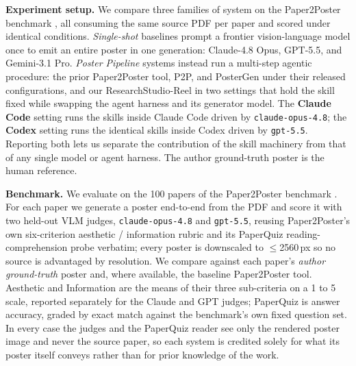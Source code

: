 \documentclass{article}
\newcommand{\reelword}{\textcolor{msred}{R}\textcolor{msgreen}{e}\textcolor{msblue}{e}\textcolor{msyellow}{l}}
\begin{document}
\textbf{Experiment setup.} We compare three families of system on the Paper2Poster benchmark \citep{paper2poster}, all consuming the same source PDF per paper and scored under identical conditions. \emph{Single-shot} baselines prompt a frontier vision-language model once to emit an entire poster in one generation: Claude-4.8 Opus, GPT-5.5, and Gemini-3.1 Pro. \emph{Poster Pipeline} systems instead run a multi-step agentic procedure: the prior Paper2Poster tool, P2P, and PosterGen under their released configurations, and our ResearchStudio-\reelword{} in two settings that hold the skill fixed while swapping the agent harness and its generator model. The \textbf{Claude Code} setting runs the skills inside Claude Code \citep{anthropic2025claudecode} driven by \texttt{claude-opus-4.8}; the \textbf{Codex} setting runs the identical skills inside Codex driven by \texttt{gpt-5.5}. Reporting both lets us separate the contribution of the skill machinery from that of any single model or agent harness. The author ground-truth poster is the human reference.

\textbf{Benchmark.} We evaluate on the 100 papers of the Paper2Poster benchmark \citep{paper2poster}. For each paper we generate a poster end-to-end from the PDF and score it with two held-out VLM judges, \texttt{claude-opus-4.8} and \texttt{gpt-5.5}, reusing Paper2Poster's own six-criterion aesthetic / information rubric and its PaperQuiz reading-comprehension probe verbatim; every poster is downscaled to $\leq$2560\,px so no source is advantaged by resolution. We compare against each paper's \emph{author ground-truth} poster and, where available, the baseline Paper2Poster tool. Aesthetic and Information are the means of their three sub-criteria on a 1 to 5 scale, reported separately for the Claude and GPT judges; PaperQuiz is answer accuracy, graded by exact match against the benchmark's own fixed question set. In every case the judges and the PaperQuiz reader see only the rendered poster image and never the source paper, so each system is credited solely for what its poster itself conveys rather than for prior knowledge of the work.
\end{document}
